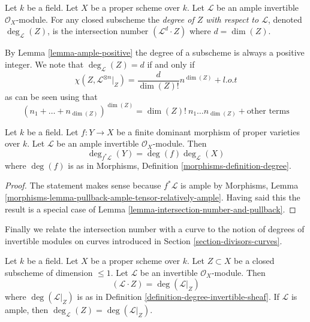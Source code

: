 \begin{definition}
\label{definition-degree}
Let $k$ be a field. Let $X$ be a proper scheme over $k$. Let
$\mathcal{L}$ be an ample invertible $\mathcal{O}_X$-module.
For any closed subscheme the {\it degree of $Z$ with respect to
$\mathcal{L}$}, denoted $\deg_\mathcal{L}(Z)$, is
the intersection number $(\mathcal{L}^d \cdot Z)$
where $d = \dim(Z)$.
\end{definition}

\noindent
By Lemma \ref{lemma-ample-positive} the degree of a subscheme is always a
positive integer. We note that $\deg_\mathcal{L}(Z) = d$ if and only if
$$
\chi(Z, \mathcal{L}^{\otimes n}|_Z) = \frac{d}{\dim(Z)!} n^{\dim(Z)} + l.o.t
$$
as can be seen using that
$$
(n_1 + \ldots + n_{\dim(Z)})^{\dim(Z)} =
\dim(Z)!\ n_1 \ldots n_{\dim(Z)} + \text{other terms}
$$

\begin{lemma}
\label{lemma-degree-finite-morphism-in-terms-degrees}
Let $k$ be a field. Let $f : Y \to X$ be a finite
dominant morphism of proper varieties over $k$. Let $\mathcal{L}$
be an ample invertible $\mathcal{O}_X$-module.
Then
$$
\deg_{f^*\mathcal{L}}(Y) = \deg(f) \deg_\mathcal{L}(X)
$$
where $\deg(f)$ is as in
Morphisms, Definition \ref{morphisms-definition-degree}.
\end{lemma}

\begin{proof}
The statement makes sense because $f^*\mathcal{L}$ is ample by
Morphisms, Lemma \ref{morphisms-lemma-pullback-ample-tensor-relatively-ample}.
Having said this the result is a special case of
Lemma \ref{lemma-intersection-number-and-pullback}.
\end{proof}

\noindent
Finally we relate the intersection number with a curve to the notion
of degrees of invertible modules on curves introduced in
Section \ref{section-divisors-curves}.

\begin{lemma}
\label{lemma-intersection-numbers-and-degrees-on-curves}
Let $k$ be a field. Let $X$ be a proper scheme over $k$.
Let $Z \subset X$ be a closed subscheme of dimension $\leq 1$.
Let $\mathcal{L}$ be an invertible $\mathcal{O}_X$-module.
Then
$$
(\mathcal{L} \cdot Z) = \deg(\mathcal{L}|_Z)
$$
where $\deg(\mathcal{L}|_Z)$ is as in
Definition \ref{definition-degree-invertible-sheaf}.
If $\mathcal{L}$ is ample, then
$\deg_\mathcal{L}(Z) = \deg(\mathcal{L}|_Z)$.
\end{lemma}

